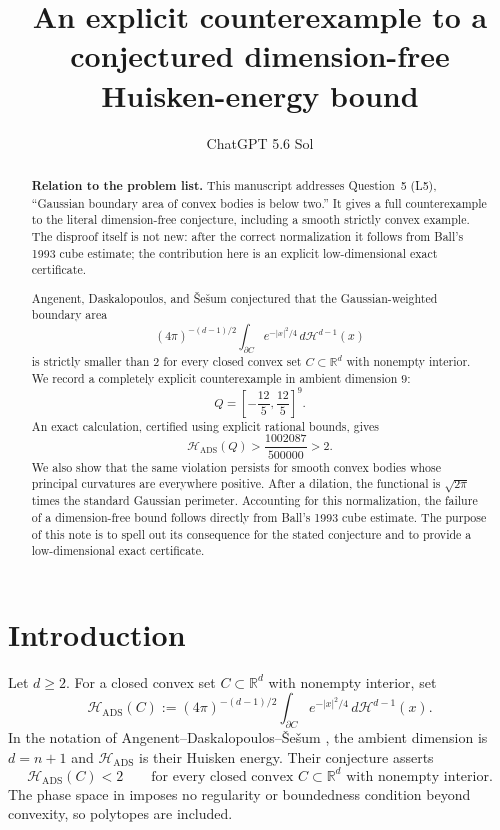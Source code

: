 \documentclass[11pt,reqno]{amsart}
\title[An explicit counterexample to a Huisken-energy bound]
{An explicit counterexample to a conjectured dimension-free
Huisken-energy bound}
\author{ChatGPT 5.6 Sol}
\theoremstyle{remark}
\newcommand{\R}{\mathbb{R}}
\newcommand{\Hads}{\mathcal{H}_{\mathrm{ADS}}}
\newcommand{\Haus}{\mathcal{H}}
\begin{document}
\begin{abstract}
\textbf{Relation to the problem list.}
This manuscript addresses Question~5 (L5), ``Gaussian boundary area of
convex bodies is below two.''  It gives a full counterexample to the literal
dimension-free conjecture, including a smooth strictly convex example.  The
disproof itself is not new: after the correct normalization it follows from
Ball's 1993 cube estimate; the contribution here is an explicit
low-dimensional exact certificate.

Angenent, Daskalopoulos, and \v{S}e\v{s}um conjectured that the
Gaussian-weighted boundary area
\[
 (4\pi)^{-(d-1)/2}\int_{\partial C}e^{-|x|^2/4}\,
 d\Haus^{d-1}(x)
\]
is strictly smaller than \(2\) for every closed convex set
\(C\subset\R^d\) with nonempty interior.  We record a completely
explicit counterexample in ambient dimension \(9\):
\[
 Q=\left[-\frac{12}{5},\frac{12}{5}\right]^9.
\]
An exact calculation, certified using explicit rational bounds, gives
\[
 \Hads(Q)>\frac{1002087}{500000}>2.
\]
We also show that the same violation
persists for smooth convex bodies whose principal curvatures are everywhere
positive.  After a dilation, the functional is
\(\sqrt{2\pi}\) times the standard Gaussian perimeter.  Accounting for this
normalization, the failure of a dimension-free bound follows directly from
Ball's 1993 cube estimate.  The purpose of this note is to spell out its
consequence for the stated conjecture and to provide a low-dimensional exact
certificate.
\end{abstract}

\maketitle

\section{Introduction}

Let \(d\ge2\).  For a closed convex set \(C\subset\R^d\) with nonempty
interior, set
\begin{equation}\label{eq:ADS-functional}
 \Hads(C)
 :=(4\pi)^{-(d-1)/2}
   \int_{\partial C}e^{-|x|^2/4}\,d\Haus^{d-1}(x).
\end{equation}
In the notation of Angenent--Daskalopoulos--\v{S}e\v{s}um
\cite[Conjecture~I]{ADS}, the ambient dimension is \(d=n+1\) and
\(\Hads\) is their Huisken energy.  Their conjecture asserts
\begin{equation}\label{eq:conjecture}
 \Hads(C)<2
 \qquad\text{for every closed convex \(C\subset\R^d\) with nonempty
 interior.}
\end{equation}
The phase space in \cite[\S1.2]{ADS} imposes no regularity or boundedness
condition beyond convexity, so polytopes are included.
\end{document}
